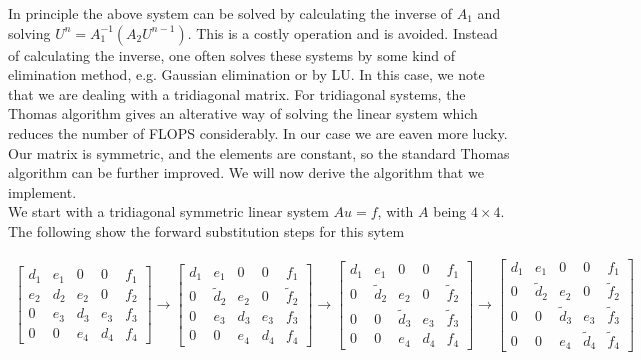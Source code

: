 \documentclass{article}
\begin{document}
In principle the above system can be solved by calculating the inverse of $A_1$ and solving $U^n = A_1^{-1} (A_2 U^{n-1})$. This is a costly operation and is avoided. Instead of calculating the inverse, one often solves these systems by some kind of elimination method, e.g. Gaussian elimination or by LU. In this case, we note that we are dealing with a tridiagonal matrix. For tridiagonal systems, the Thomas algorithm gives an alterative way of solving the linear system which reduces the number of FLOPS considerably. In our case we are eaven more lucky. Our matrix is symmetric, and the elements are constant, so the standard Thomas algorithm can be further improved. We will now derive the algorithm that we implement.\\

We start with a tridiagonal symmetric linear system $Au =f$, with $A$ being $4 \times 4$. The following show the forward substitution steps for this sytem

\begin{subequations}
	\begin{align}
		\begin{bmatrix}
		     d_1 & e_1 & 0 & 0 & f_1\\
		      e_2 & d_2 & e_2 & 0 & f_2\\
			 0 & e_3 & d_3 & e_3 & f_3\\
	         0 & 0 & e_4 & d_4 & f_4
		\end{bmatrix}
		\rightarrow
		\begin{bmatrix}
		d_1 & e_1 & 0 & 0 & f_1\\
		0 & \tilde{d}_2 & e_2 & 0 & \tilde{f}_2\\
		0 & e_3 & d_3 & e_3 & f_3\\
		0 & 0 & e_4 & d_4 & f_4
		\end{bmatrix}
		\rightarrow
		\begin{bmatrix}
		d_1 & e_1 & 0 & 0 & f_1\\
		0 & \tilde{d}_2 & e_2 & 0 &\tilde{f}_2 \\
		0 & 0 & \tilde{d}_3 & e_3 & \tilde{f}_3\\
		0 & 0 & e_4 & d_4 & f_4
		\end{bmatrix}
		\rightarrow
		\begin{bmatrix}
		d_1 & e_1 & 0 & 0 & f_1\\
		0 & \tilde{d}_2 & e_2 & 0 &\tilde{f}_2 \\
		0 & 0 & \tilde{d}_3 & e_3 & \tilde{f}_3\\
		0 & 0 & e_4 & \tilde{d}_4 & \tilde{f}_4
		\end{bmatrix}
	\end{align}\label{eq:thomas1}
\end{subequations}
\end{document}
